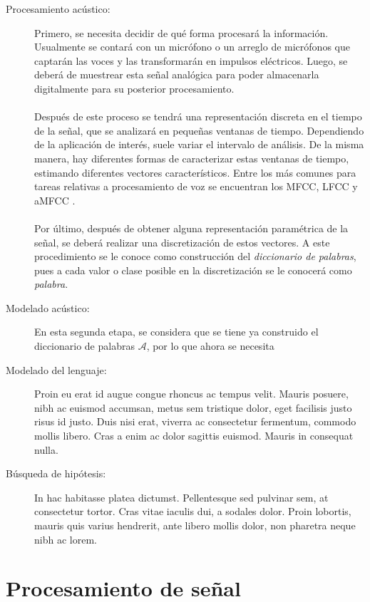 \begin{description}
\item[Procesamiento acústico:]
Primero, se necesita decidir de qué forma procesará la información. Usualmente se contará con un micrófono o un arreglo de micrófonos que captarán las voces y las transformarán en impulsos eléctricos. Luego, se deberá de muestrear esta señal analógica para poder almacenarla digitalmente para su posterior procesamiento. 
\\~\\
Después de este proceso se tendrá una representación discreta en el tiempo de la señal, que se analizará en pequeñas ventanas de tiempo. Dependiendo de la aplicación de interés, suele variar el intervalo de análisis. De la misma manera, hay diferentes formas de caracterizar estas ventanas de tiempo, estimando diferentes vectores característicos. Entre los más comunes para tareas relativas a procesamiento de voz se encuentran los \acs{MFCC}, \acs{LFCC} \cite{Davis1980} y \acs{aMFCC} \cite{Lei2009}. 
\\~\\
Por último, después de obtener alguna representación paramétrica de la señal, se deberá realizar una discretización de estos vectores. A este procedimiento se le conoce como construcción del \textit{diccionario de palabras}, pues a cada valor o clase posible en la discretización se le conocerá como \textit{palabra}.

\item[Modelado acústico:] 
En esta segunda etapa, se considera que se tiene ya construido el diccionario de palabras $\mathcal{A}$, por lo que ahora se necesita 

 
\item[Modelado del lenguaje:]
Proin eu erat id augue congue rhoncus ac tempus velit. Mauris posuere, nibh ac euismod accumsan, metus sem tristique dolor, eget facilisis justo risus id justo. Duis nisi erat, viverra ac consectetur fermentum, commodo mollis libero. Cras a enim ac dolor sagittis euismod. Mauris in consequat nulla. 

\item[Búsqueda de hipótesis:]
In hac habitasse platea dictumst. Pellentesque sed pulvinar sem, at consectetur tortor. Cras vitae iaculis dui, a sodales dolor. Proin lobortis, mauris quis varius hendrerit, ante libero mollis dolor, non pharetra neque nibh ac lorem.
\end{description}

\section{Procesamiento de señal}

